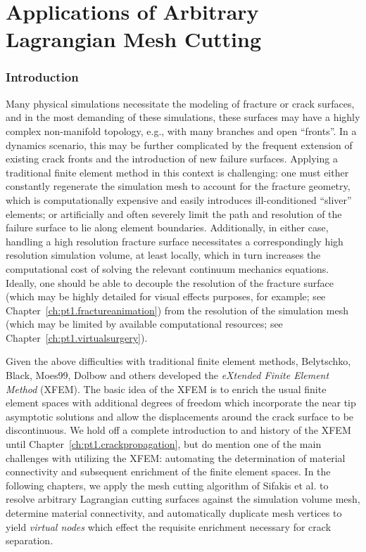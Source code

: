 %

\part{Applications of Arbitrary Lagrangian Mesh Cutting}

\renewcommand{\thechapter}{\thepart}

\section*{Introduction}

Many physical simulations necessitate the modeling of fracture or crack surfaces, and in the most demanding of these simulations, these surfaces may have a highly complex non-manifold topology, e.g., with many branches and open ``fronts''. In a dynamics scenario, this may be further complicated by the frequent extension of existing crack fronts and the introduction of new failure surfaces. Applying a traditional finite element method in this context is challenging: one must either constantly regenerate the simulation mesh to account for the fracture geometry, which is computationally expensive and easily introduces ill-conditioned ``sliver'' elements; or artificially and often severely limit the path and resolution of the failure surface to lie along element boundaries. Additionally, in either case, handling a high resolution fracture surface necessitates a correspondingly high resolution simulation volume, at least locally, which in turn increases the computational cost of solving the relevant continuum mechanics equations. Ideally, one should be able to decouple the resolution of the fracture surface (which may be highly detailed for visual effects purposes, for example; see Chapter~\ref{ch:pt1.fractureanimation}) from the resolution of the simulation mesh (which may be limited by available computational resources; see Chapter~\ref{ch:pt1.virtualsurgery}).

Given the above difficulties with traditional finite element methods, Belytschko, Black, Moes99, Dolbow \cite{Belytschko99, Moes99} and others developed the \emph{eXtended Finite Element Method} (XFEM). The basic idea of the XFEM is to enrich the usual finite element spaces with additional degrees of freedom which incorporate the near tip asymptotic solutions and allow the displacements around the crack surface to be discontinuous. We hold off a complete introduction to and history of the XFEM until Chapter~\ref{ch:pt1.crackpropagation}, but do mention one of the main challenges with utilizing the XFEM: automating the determination of material connectivity and subsequent enrichment of the finite element spaces. In the following chapters, we apply the mesh cutting algorithm of Sifakis et al. \cite{Sifakis07} to resolve arbitrary Lagrangian cutting surfaces against the simulation volume mesh, determine material connectivity, and automatically duplicate mesh vertices to yield \emph{virtual nodes} which effect the requisite enrichment necessary for crack separation.

